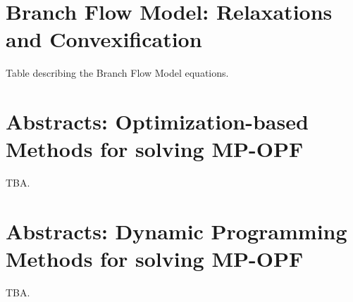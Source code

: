 \appendix

\makeatletter
\renewcommand{\@makechapterhead}[1]{\vspace *{-10\p@ }{\parindent \z@ 
\raggedright \normalfont \ifnum \c@secnumdepth >\m@ne \Huge \bfseries 
\@chapapp \space \thechapter \vskip 10\p@ \fi #1\par \nobreak \vskip 30\p@ }}
\makeatother

\chapter{Branch Flow Model: Relaxations and Convexification}
\begin{table}[!h]
	\caption{Table describing the Branch Flow Model equations.}
	\label{tab:bfm1}
	\centering
	\hspace*{-2cm}
	
\end{table}

\chapter{Abstracts: Optimization-based Methods for solving MP-OPF}
TBA.

\chapter{Abstracts: Dynamic Programming Methods for solving MP-OPF}
TBA.